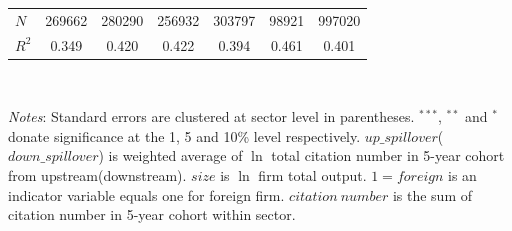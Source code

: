 \documentclass[12pt]{article}%
\begin{document}
\begin{CJK*}{GBK}{fs}
\begin{table}[!h]
{{{\begin{tabular}{l*{6}{c}}
\hline
\(N\)       &     269662 &     280290 &     256932 &     303797 &      98921 &     997020     \\
\(R^{2}\)   &      0.349 &      0.420 &      0.422 &      0.394 &      0.461 &      0.401     \\
\hline\hline
\end{tabular}
}\\
}
}
\scriptsize {
\par \emph{Notes}: Standard errors are clustered at sector level in parentheses. $^{***}$, $^{**}$ and $^{*}$ donate significance at the 1, 5 and 10\% level respectively. $up\_spillover$($down\_spillover$) is weighted average of $\ln$ total citation number in 5-year cohort from upstream(downstream). $size$ is $\ln$ firm total output. $1=foreign$ is an indicator variable equals one for foreign firm. $citation~number$ is the sum of citation number in 5-year cohort within sector.}
\end{table}
\clearpage















\end{CJK*}
\end{document}

